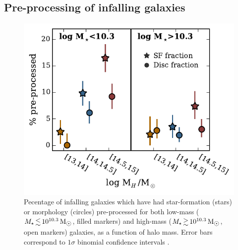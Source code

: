 \documentclass[a4paper,fleqn,usenatbib]{mnras}
\newcommand{\Msun}{\,\mathrm{M_{\sun}}}
\begin{document}
\subsection{Pre-processing of infalling galaxies}

\begin{figure}
  \centering
  \includegraphics[width=\columnwidth]{pp_mh.pdf}
  \caption{Pecentage of infalling galaxies which have had
    star-formation (stars) or morphology (circles) pre-processed for
    both low-mass ($M_\star \la 10^{10.3}\Msun$, filled markers) and 
  high-mass ($M_\star \ga 10^{10.3}\Msun$, open markers) galaxies, as
  a function of halo mass.  Error bars correspond to $1\sigma$
  binomial confidence intervals \citep{cameron2011}.}
  \label{fig:pp_mh}
\end{figure}
\end{document}

